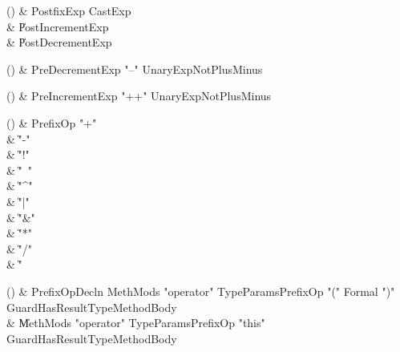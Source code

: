 \begin{bbgrammarappendix}{4.0in}

() & PostfixExp \label{prod:PostfixExp}  \: CastExp  \\

 &    \| PostIncrementExp \\
 &    \| PostDecrementExp \\

\end{bbgrammarappendix}

\begin{bbgrammarappendix}{3.5in}

() & PreDecrementExp \label{prod:PreDecrementExp}  \: \xcd"--" UnaryExpNotPlusMinus  \\


\end{bbgrammarappendix}

\begin{bbgrammarappendix}{3.5in}

() & PreIncrementExp \label{prod:PreIncrementExp}  \: \xcd"++" UnaryExpNotPlusMinus  \\


\end{bbgrammarappendix}

\begin{bbgrammarappendix}{4.2in}

() & PrefixOp \label{prod:PrefixOp}  \: \xcd"+"  \\

 &    \| \xcd"-" \\
 &    \| \xcd"!" \\
 &    \| \xcd"~" \\
 &    \| \xcd"^" \\
 &    \| \xcd"|" \\
 &    \| \xcd"&" \\
 &    \| \xcd"*" \\
 &    \| \xcd"/" \\
 &    \| \xcd"%

\end{bbgrammarappendix}

\begin{bbgrammarappendix}{3.7in}

() & PrefixOpDecln \label{prod:PrefixOpDecln}  \: MethMods \xcd"operator" TypeParams\opt PrefixOp \xcd"(" Formal  \xcd")" Guard\opt HasResultType\opt MethodBody  \\

 &    \| MethMods \xcd"operator" TypeParams\opt PrefixOp \xcd"this" Guard\opt HasResultType\opt MethodBody \\

\end{bbgrammarappendix}

